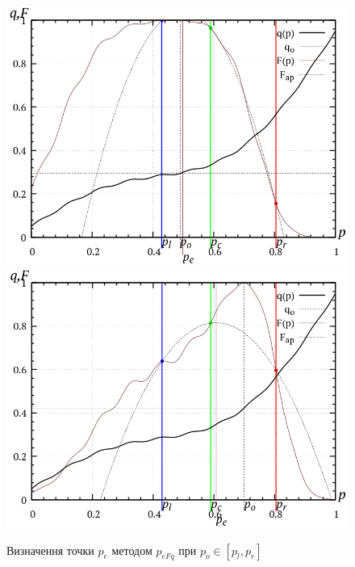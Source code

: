 \documentclass[a4paper,13pt]{atuaref}
\newlength\TW
\begin{document}
\begin{figure}[htb!]
  \centerline{
    \includegraphics[width=49\TW]{p3/p/p_eFq/q_p_eFq_p49_xl.png}
    \hfill
    \includegraphics[width=49\TW]{p3/p/p_eFq/q_p_eFq_p70_xl.png}
  }
  \caption{Визначення точки $p_e$ методом $p_{eFq}$ при $p_o \in [p_l, p_r]$}
  \label{atu:f:p_eFq_intra}
\end{figure}

\end{document}
